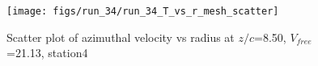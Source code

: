 \begin{figure}[H]
\centering
\texttt{[image: figs/run\_34/run\_34\_T\_vs\_r\_mesh\_scatter]}
\caption{Scatter plot of azimuthal velocity vs radius at $z/c$=8.50, $V_{free}$=21.13, station4}
\label{fig:run_34_T_vs_r_mesh_scatter}
\end{figure}


